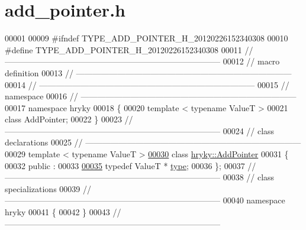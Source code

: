 \hypertarget{add__pointer_8h_source}{\section{add\-\_\-pointer.\-h}
}

\begin{DoxyCode}
00001 
00009 \textcolor{preprocessor}{#ifndef TYPE\_ADD\_POINTER\_H\_20120226152340308}
00010 \textcolor{preprocessor}{}\textcolor{preprocessor}{#define TYPE\_ADD\_POINTER\_H\_20120226152340308}
00011 \textcolor{preprocessor}{}\textcolor{comment}{//
      ------------------------------------------------------------------------------}
00012 \textcolor{comment}{// macro definition}
00013 \textcolor{comment}{//
      ------------------------------------------------------------------------------}
00014 \textcolor{comment}{//
      ------------------------------------------------------------------------------}
00015 \textcolor{comment}{// namespace}
00016 \textcolor{comment}{//
      ------------------------------------------------------------------------------}
00017 \textcolor{keyword}{namespace }hryky
00018 \{
00020     \textcolor{keyword}{template} < \textcolor{keyword}{typename} ValueT >
00021     \textcolor{keyword}{class }AddPointer;
00022 \}
00023 \textcolor{comment}{//
      ------------------------------------------------------------------------------}
00024 \textcolor{comment}{// class declarations}
00025 \textcolor{comment}{//
      ------------------------------------------------------------------------------}
00029 \textcolor{comment}{}\textcolor{keyword}{template} < \textcolor{keyword}{typename} ValueT >
\hypertarget{add__pointer_8h_source_l00030}{}\hyperlink{classhryky_1_1_add_pointer}{00030} \textcolor{keyword}{class }\hyperlink{classhryky_1_1_add_pointer}{hryky::AddPointer}
00031 \{
00032 \textcolor{keyword}{public} :
00033 
\hypertarget{add__pointer_8h_source_l00035}{}\hyperlink{classhryky_1_1_add_pointer_a02d0c31ee76f5cb3f0ba3ca4c01fc8d3}{00035}     \textcolor{keyword}{typedef} ValueT *        \hyperlink{classhryky_1_1_add_pointer_a02d0c31ee76f5cb3f0ba3ca4c01fc8d3}{type};
00036 \};
00037 \textcolor{comment}{//
      ------------------------------------------------------------------------------}
00038 \textcolor{comment}{// class specializations}
00039 \textcolor{comment}{//
      ------------------------------------------------------------------------------}
00040 \textcolor{keyword}{namespace }hryky
00041 \{
00042 \}
00043 \textcolor{comment}{//
      ------------------------------------------------------------------------------}

\end{DoxyCode}
